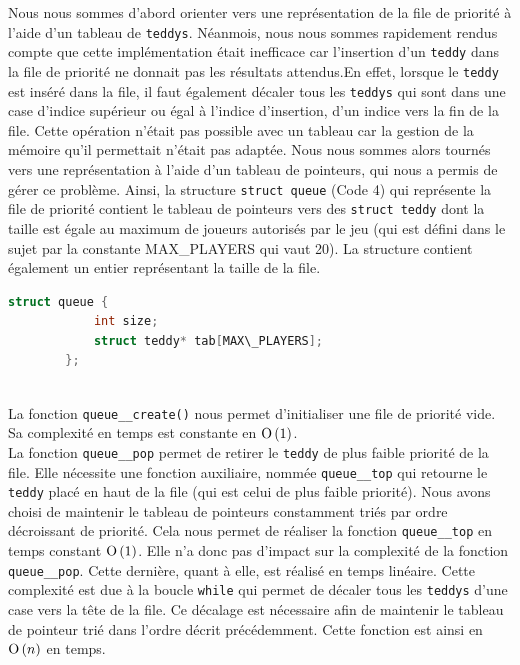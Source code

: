 \documentclass[12pt]{article}
\begin{document}
\begin{itemize}
        Nous nous sommes d'abord orienter vers une représentation de la file de priorité à l'aide d'un tableau de \texttt{teddys}. Néanmois, nous nous sommes rapidement rendus compte que cette implémentation était inefficace car l'insertion d'un \texttt{teddy} dans la file de priorité ne donnait pas les résultats attendus.En effet, lorsque le \texttt{teddy} est inséré dans la file, il faut également décaler tous les \texttt{teddys} qui sont dans une case d'indice supérieur ou égal à l'indice d'insertion, d'un indice vers la fin de la file. Cette opération n'était pas possible avec un tableau car la gestion de la mémoire qu'il permettait n'était pas adaptée. Nous nous sommes alors tournés vers une représentation à l'aide d'un tableau de pointeurs, qui nous a permis de gérer ce problème.
        Ainsi, la structure \texttt{struct queue} (Code 4) qui représente la file de priorité contient le tableau de pointeurs vers des \texttt{struct teddy} dont la taille est égale au maximum de joueurs autorisés par le jeu (qui est défini dans le sujet par la constante MAX\_PLAYERS qui vaut 20). La structure contient également un entier représentant la taille de la file.
        \begin{lstlisting}[language=C, caption=Structure \texttt{queue}]
         struct queue {
            int size;
            struct teddy* tab[MAX\_PLAYERS];
        };\end{lstlisting}
        \\
        La fonction \texttt{queue\_\_create()} nous permet d'initialiser une file de priorité vide. Sa complexité en temps est constante en ${\text{O}}\left(1\right)$. \\
        
        La fonction \texttt{queue\_\_pop} permet de retirer le \texttt{teddy} de plus faible priorité de la file. Elle nécessite une fonction auxiliaire, nommée \texttt{queue\_\_top} qui retourne le \texttt{teddy} placé en haut de la file (qui est celui de plus faible priorité). Nous avons choisi de maintenir le tableau de pointeurs constamment triés par ordre décroissant de priorité. Cela nous permet de réaliser la fonction \texttt{queue\_\_top} en temps constant ${\text{O}}\left(1\right)$. Elle n'a  donc pas d'impact sur la complexité de la fonction \texttt{queue\_\_pop}. Cette dernière, quant à elle, est réalisé en temps linéaire. Cette complexité est due à la boucle \texttt{while} qui permet de décaler tous les \texttt{teddys} d'une case vers la tête de la file. Ce décalage est nécessaire afin de maintenir le tableau de pointeur trié dans l'ordre décrit précédemment. Cette fonction est ainsi en ${\text{O}}\left(n\right)$ en temps.\\
        

\end{itemize}
\end{document}

